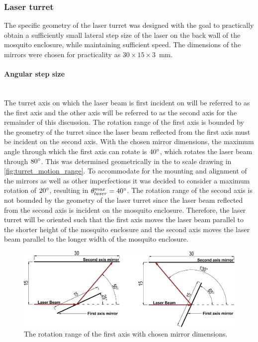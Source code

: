 \subsubsection{Laser turret}\label{subsubsec:laser_turret_design}
The specific geometry of the laser turret was designed with the goal to practically obtain a sufficiently small lateral step size of the laser on the back wall of the mosquito enclosure, while maintaining sufficient speed. The dimensions of the mirrors were chosen for practicality as $30 \times 15 \times 3$~mm.


\label{par:angular_step_size}
\paragraph{Angular step size}\mbox{}\\
The turret axis on which the laser beam is first incident on will be referred to as the first axis and the other axis will be referred to as the second axis for the remainder of this discussion. The rotation range of the first axis is bounded by the geometry of the turret since the laser beam reflected from the first axis must be incident on the second axis. With the chosen mirror dimensions, the maximum angle through which the first axis can rotate is $40^{\circ}$, which rotates the laser beam through $80^{\circ}$. This was determined geometrically in the to scale drawing in \autoref{fig:turret_motion_range}. To accommodate for the mounting and alignment of the mirrors as well as other imperfections it was decided to consider a maximum rotation of $20^{\circ}$, resulting in $\theta_{laser}^{max} = 40^{\circ}$. The rotation range of the second axis is not bounded by the geometry of the laser turret since the laser beam reflected from the second axis is incident on the mosquito enclosure. Therefore, the laser turret will be oriented such that the first axis moves the laser beam parallel to the shorter height of the mosquito enclosure and the second axis moves the laser beam parallel to the longer width of the mosquito enclosure.
\begin{figure}[h]
  \centering
  \includegraphics[width=\textwidth]{figures/anton hoeke.pdf}
  \caption{The rotation range of the first axis with chosen mirror dimensions.}
  \label{fig:turret_motion_range}
\end{figure}

